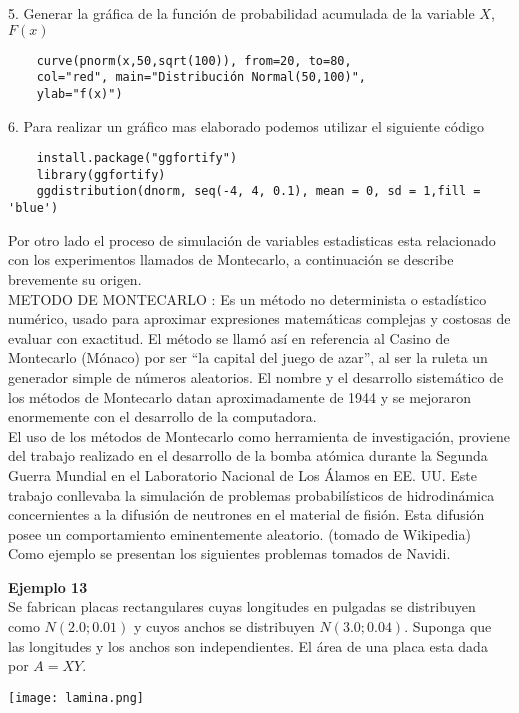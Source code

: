 \documentclass[base=hide,12pt]{elegantbook}
\begin{document}
5. Generar la gráfica de la función de probabilidad acumulada de la variable $X$,  $F(x)$
\begin{lstlisting}
	curve(pnorm(x,50,sqrt(100)), from=20, to=80, 
	col="red", main="Distribución Normal(50,100)",
	ylab="f(x)")
\end{lstlisting}
6. Para realizar un gráfico mas elaborado podemos utilizar el siguiente código
\begin{lstlisting}
	install.package("ggfortify")
	library(ggfortify)
	ggdistribution(dnorm, seq(-4, 4, 0.1), mean = 0, sd = 1,fill = 'blue')
\end{lstlisting}
\vspace{1cm}
Por otro lado el proceso de simulación de variables estadisticas esta relacionado con los experimentos llamados de  Montecarlo, a continuación se describe brevemente su origen. \\

METODO DE MONTECARLO : Es un método no determinista o estadístico numérico, usado para aproximar expresiones matemáticas complejas y costosas de evaluar con exactitud. El método se llamó así en referencia al Casino de Montecarlo (Mónaco) por ser “la capital del juego de azar”, al ser la ruleta un generador simple de números aleatorios. El nombre y el desarrollo sistemático de los métodos de Montecarlo datan aproximadamente de 1944 y se mejoraron enormemente con el desarrollo de la computadora.  \\

El uso de los métodos de Montecarlo como herramienta de investigación, proviene del trabajo realizado en el desarrollo de la bomba atómica durante la Segunda Guerra Mundial en el Laboratorio Nacional de Los Álamos en EE. UU. Este trabajo conllevaba la simulación de problemas probabilísticos de hidrodinámica concernientes a la difusión de neutrones en el material de fisión. Esta difusión posee un comportamiento eminentemente aleatorio.	
(tomado de Wikipedia) \\

Como ejemplo se presentan los siguientes problemas tomados de Navidi.
\vspace{1cm} 

\textcolor{col3}{\bf \large Ejemplo 13}\\

Se fabrican placas rectangulares cuyas longitudes en pulgadas se distribuyen como $N(2.0; 0.01)$ y cuyos anchos se distribuyen $N(3.0; 0.04)$. Suponga que las longitudes y los anchos son independientes. El área de una placa esta dada por $A=XY$.
\begin{center}
	\texttt{[image: lamina.png]}
\end{center}
\end{document}
